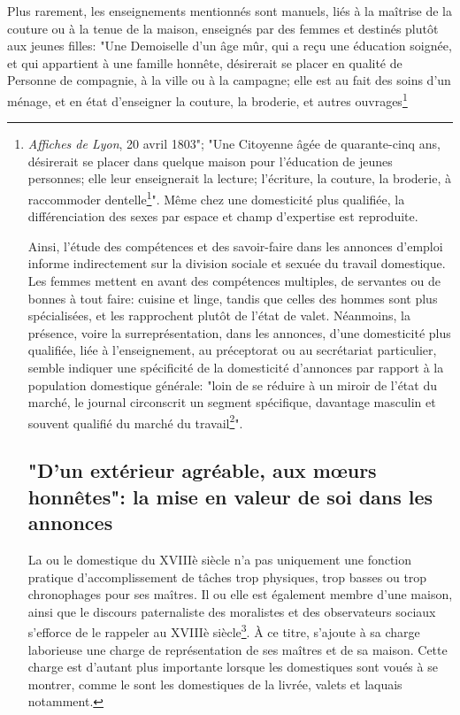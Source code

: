 Plus rarement, les enseignements mentionnés sont manuels, liés à la maîtrise de la couture ou à la tenue de la maison, enseignés par des femmes et destinés plutôt aux jeunes filles: "Une Demoiselle d'un âge mûr, qui a reçu une éducation soignée, et qui appartient à une famille honnête, désirerait se placer en qualité de Personne de compagnie, à la ville ou à la campagne; elle est au fait des soins d'un ménage, et en état d'enseigner la couture, la broderie, et autres ouvrages\footnote{\textit{Affiches de Lyon}, 20 avril 1803"; "Une Citoyenne âgée de quarante-cinq ans, désirerait se placer dans quelque maison pour l'éducation de jeunes personnes; elle leur enseignerait la lecture; l'écriture, la couture, la broderie, à raccommoder dentelle\footnote{\textit{Affiches de Lyon}, 16 septembre 1795}". Même chez une domesticité plus qualifiée, la différenciation des sexes par espace et champ d'expertise est reproduite. 


\bigskip

Ainsi, l'étude des compétences et des savoir-faire dans les annonces d'emploi informe indirectement sur la division sociale et sexuée du travail domestique. Les femmes mettent en avant des compétences multiples, de servantes ou de bonnes à tout faire: cuisine et linge, tandis que celles des hommes sont plus spécialisées, et les rapprochent plutôt de l'état de valet. Néanmoins, la présence, voire la surreprésentation, dans les annonces, d'une domesticité plus qualifiée, liée à l'enseignement, au préceptorat ou au secrétariat particulier, semble indiquer une spécificité de la domesticité d'annonces par rapport à la population domestique générale: "loin de se réduire à un miroir de l’état du marché, le journal circonscrit un segment spécifique, davantage masculin et souvent qualifié du marché du travail\footcites{kramplPresseAnnoncesParisienne2020}". 



\chapter{"D'un extérieur agréable, aux mœurs honnêtes": la mise en valeur de soi dans les annonces}

La ou le domestique du XVIIIè siècle n'a pas uniquement une fonction pratique d'accomplissement de tâches trop physiques, trop basses ou trop chronophages pour ses maîtres. Il ou elle est également membre d'une maison, ainsi que le discours paternaliste des moralistes et des observateurs sociaux s'efforce de le rappeler au XVIIIè siècle\footcites{sabattierChapitreEnseigneSon1984}. À ce titre, s'ajoute à sa charge laborieuse une charge de représentation de ses maîtres et de sa maison. Cette charge est d'autant plus importante lorsque les domestiques sont voués à se montrer, comme le sont les domestiques de la livrée, valets et laquais notamment. 

}
